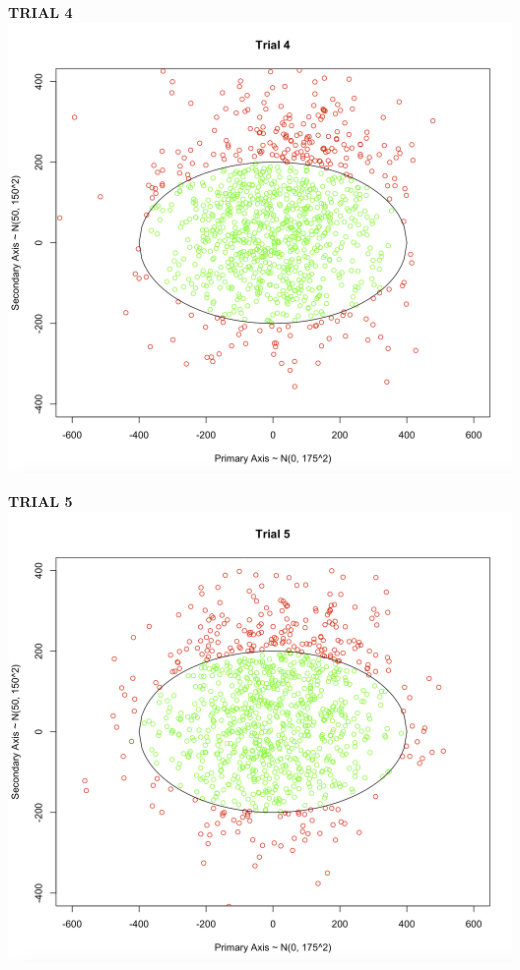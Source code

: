 \documentclass[svgnames]{article}
\begin{document}
\textbf{TRIAL 4}
\newline
\includegraphics[scale=.35]{trial4}

\textbf{TRIAL 5}
\newline
\includegraphics[scale=.35]{trial5}
\end{document}

